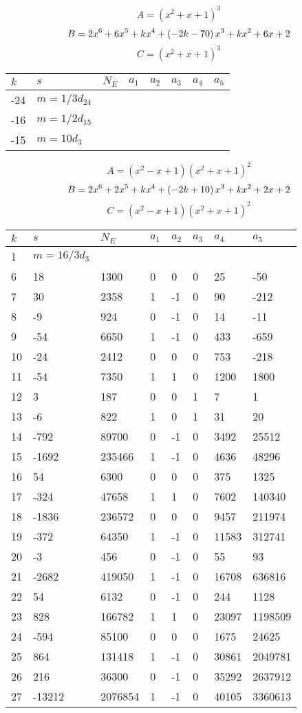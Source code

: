 \documentclass{amsart}
\begin{document}
$$A=(x^2
 + x
 + 1)^{3}$$
$$B=2\*x^6
 + 6\*x^5
 + k\*x^4
 + \left(-2\*k
 - 70\right) \*x^3
 + k\*x^2
 + 6\*x
 + 2$$
$$C=(x^2
 + x
 + 1)^{3}$$
\begin{longtable}{|l|l|l|lllll|}
\hline
$k$ & $s$ & $N_E$ & $a_1$ & $a_2$ & $a_3$ & $a_4$ & $a_5$\\
\hline
-24&$m=1/3d_{24}$&&\multicolumn{5}{c|}{}\\
-16&$m=1/2d_{15}$&&\multicolumn{5}{c|}{}\\
-15&$m=10d_{3}$&&\multicolumn{5}{c|}{}\\
\hline
\end{longtable}
$$A=(x^2
 - x
 + 1)(x^2
 + x
 + 1)^{2}$$
$$B=2\*x^6
 + 2\*x^5
 + k\*x^4
 + \left(-2\*k
 + 10\right) \*x^3
 + k\*x^2
 + 2\*x
 + 2$$
$$C=(x^2
 - x
 + 1)(x^2
 + x
 + 1)^{2}$$
\begin{longtable}{|l|l|l|lllll|}
\hline
$k$ & $s$ & $N_E$ & $a_1$ & $a_2$ & $a_3$ & $a_4$ & $a_5$\\
\hline
1&$m=16/3d_{3}$&&\multicolumn{5}{c|}{}\\
6&18&1300&0&0&0&25&-50\\
7&30&2358&1&-1&0&90&-212\\
8&-9&924&0&-1&0&14&-11\\
9&-54&6650&1&-1&0&433&-659\\
10&-24&2412&0&0&0&753&-218\\
11&-54&7350&1&1&0&1200&1800\\
12&3&187&0&0&1&7&1\\
13&-6&822&1&0&1&31&20\\
14&-792&89700&0&-1&0&3492&25512\\
15&-1692&235466&1&-1&0&4636&48296\\
16&54&6300&0&0&0&375&1325\\
17&-324&47658&1&1&0&7602&140340\\
18&-1836&236572&0&0&0&9457&211974\\
19&-372&64350&1&-1&0&11583&312741\\
20&-3&456&0&-1&0&55&93\\
21&-2682&419050&1&-1&0&16708&636816\\
22&54&6132&0&-1&0&244&1128\\
23&828&166782&1&1&0&23097&1198509\\
24&-594&85100&0&0&0&1675&24625\\
25&864&131418&1&-1&0&30861&2049781\\
26&216&36300&0&-1&0&35292&2637912\\
27&-13212&2076854&1&-1&0&40105&3360613\\

\end{longtable}
\end{document}

